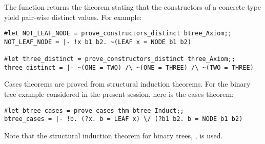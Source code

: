 The function  returns the theorem stating
that the constructors of a concrete type yield pair-wise distinct values.  For
example:

\begin{session}\begin{verbatim}
#let NOT_LEAF_NODE = prove_constructors_distinct btree_Axiom;;
NOT_LEAF_NODE = |- !x b1 b2. ~(LEAF x = NODE b1 b2)

#let three_distinct = prove_constructors_distinct three_Axiom;;
three_distinct = |- ~(ONE = TWO) /\ ~(ONE = THREE) /\ ~(TWO = THREE)
\end{verbatim}\end{session}

Cases theorems are proved from structural induction theorems. For the binary
tree example considered in the present session, here is the cases theorem:

\begin{session}\begin{verbatim}
#let btree_cases = prove_cases_thm btree_Induct;;
btree_cases = |- !b. (?x. b = LEAF x) \/ (?b1 b2. b = NODE b1 b2)
\end{verbatim}\end{session}

\noindent Note that the structural induction theorem for binary trees,
, is used.



